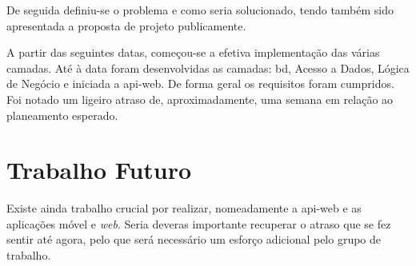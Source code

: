De seguida definiu-se o problema e como seria solucionado, tendo também sido apresentada a proposta de projeto publicamente.

A partir das seguintes datas, começou-se a efetiva implementação das várias camadas. Até à data foram desenvolvidas as camadas: \acrlong{bd}, Acesso a Dados, Lógica de Negócio e iniciada a \gls{api-web}. De forma geral os requisitos foram cumpridos. Foi notado um ligeiro atraso de, aproximadamente, uma semana em relação ao planeamento esperado.

\section{Trabalho Futuro}\label{sec53}

Existe ainda trabalho crucial por realizar, nomeadamente a \gls{api-web} e as aplicações móvel e \textit{web}. Seria deveras importante recuperar o atraso que se fez sentir até agora, pelo que será necessário um esforço adicional pelo grupo de trabalho.